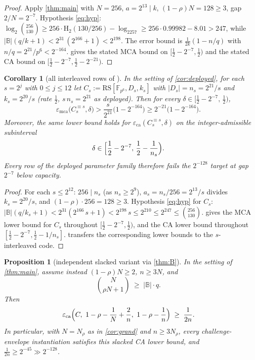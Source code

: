\documentclass[11pt]{article}
\newtheorem{proposition}[proposition]{Proposition}
\newtheorem{corollary}[corollary]{Corollary}
\theoremstyle{definition}
\theoremstyle{remark}
\newcommand{\F}{\mathbb{F}}
\newcommand{\B}{\mathbb{B}}
\newcommand{\RS}{\mathrm{RS}}
\newcommand{\eca}{\varepsilon_{\mathrm{ca}}}
\newcommand{\emca}{\varepsilon_{\mathrm{mca}}}
\newcommand{\Hb}{\mathrm{H}_2}
\begin{document}
\begin{proof}
Apply \cref{thm:main} with $N=256$, $a=2^{13}\mid k$, $(1-\rho)N=128\ge3$, gap $2/N=2^{-7}$. Hypothesis \eqref{eq:hyp}: $\log_2\binom{256}{130}\ge256\cdot\Hb(130/256)-\log_2257\ge256\cdot0.99982-8.01>247$, while $|\B|(q/k+1)<2^{31}\,(2^{166}+1)<2^{198}$. The error bound is $\frac1{2k}(1-n/q)$ with $n/q=2^{21}/p^6<2^{-164}$.  gives the stated MCA bound on $[\frac12-2^{-7},\frac12)$ and the stated CA bound on $[\frac12-2^{-7},\frac12-2^{-21})$.
\end{proof}

\begin{corollary}[all interleaved rows of {\cite[Tables 2--3]{ABF26}}]\label{cor:rows}
In the setting of \cref{cor:deployed}, for each $s=2^j$ with $0\le j\le12$ let $C_s:=\RS[\F_{p^6},D_s,k_s]$ with $|D_s|=n_s=2^{21}/s$ and $k_s=2^{20}/s$ (rate $\frac12$, $s\,n_s=2^{21}$ as deployed). Then for every $\delta\in\bigl[\frac12-2^{-7},\,\frac12\bigr)$,
\[
\emca\bigl(C_s^{\equiv s},\delta\bigr)
>
\frac s{2^{21}}\bigl(1-2^{-164}\bigr)
\ge
2^{-21}\bigl(1-2^{-164}\bigr).
\]
Moreover, the same lower bound holds for $\eca(C_s^{\equiv s},\delta)$ on the integer-admissible subinterval
\[
        \delta\in
        \Bigl[\frac12-2^{-7},\,\frac12-\frac1{n_s}\Bigr).
\]
Every row of the deployed parameter family therefore fails the $2^{-128}$ target at gap $2^{-7}$ below capacity.
\end{corollary}

\begin{proof}
For each $s\le2^{12}$: $256\mid n_s$ (as $n_s\ge2^9$), $a_s=n_s/256=2^{13}/s$ divides $k_s=2^{20}/s$, and $(1-\rho)\cdot256=128\ge3$. Hypothesis \eqref{eq:hyp} for $C_s$: $|\B|(q/k_s+1)<2^{31}(2^{166}\,s+1)<2^{198}\,s\le2^{210}\le2^{247}\le\binom{256}{130}$.  gives the MCA lower bound for $C_s$ throughout $[\frac12-2^{-7},\frac12)$, and the CA lower bound throughout $[\frac12-2^{-7},\frac12-1/n_s]$.  transfers the corresponding lower bounds to the $s$-interleaved code.
\end{proof}

\begin{proposition}[independent slacked variant via \cref{thm:B}]\label{prop:slacked}
In the setting of \cref{thm:main}, assume instead $(1-\rho)N\ge2$, $n\ge3N$, and
\[
\binom{N}{\rho N+1}\;\ge\;|\B|\cdot q .
\]
Then
\[
\eca\Bigl(C,\ 1-\rho-\frac1N+\frac2n,\ 1-\rho-\frac1n\Bigr)\;\ge\;\frac1{2n}.
\]
In particular, with $N=N_\rho$ as in \cref{cor:grand} and $n\ge3N_\rho$, every challenge-envelope instantiation satisfies this slacked CA lower bound, and $\frac1{2n}\ge2^{-45}\gg2^{-128}$.
\end{proposition}
\end{document}
